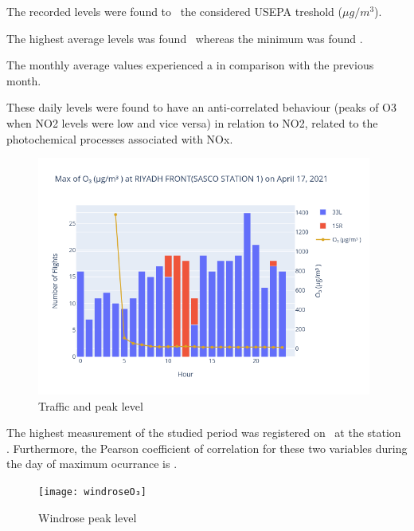 \documentclass[12pt, oneside]{book}
\begin{document}
The recorded  levels were found to \tresholdOthree\ the considered USEPA treshold (\limitOthree $\mu g/m^3$).

The highest average  levels was found \maxDailyOthree\ whereas the minimum was found \minDailyOthree.


The monthly average values experienced a \monthChangeOthree in comparison with the previous month.

These daily levels were found to have an anti-correlated behaviour (peaks of O3 when NO2 levels were low and vice versa) in relation to NO2, related to the photochemical processes associated with NOx.

{\begin{figure}[H]
\centering
\includegraphics[width=0.98\textwidth, keepaspectratio]{image12}
\caption{Traffic and  peak level}\label{image12}
\end{figure}}{}


The highest measurement of the studied period was registered  on \dayMaxOthree \ at the station \stationMaxOthree . 
Furthermore, the Pearson coefficient of correlation for these two variables during the day of maximum ocurrance is \correlOthree .  

{\begin{figure}[H]
\centering
\texttt{[image: windroseO₃]}
\caption{Windrose  peak level}\label{windroseO3}
\end{figure}}{}
\end{document}
